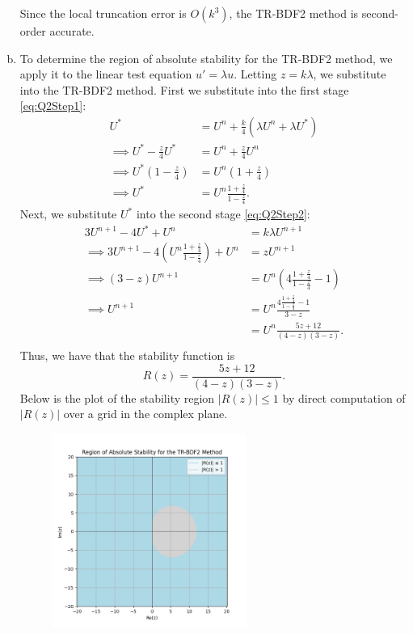\documentclass{article}
\begin{document}
\begin{enumerate}[(a)]
    Since the local truncation error is $O(k^3)$, the TR-BDF2 method is second-order accurate.





    \item To determine the region of absolute stability for the TR-BDF2 method, we apply it to the linear test equation $u' = \lambda u$. Letting $z = k\lambda$, we substitute into the TR-BDF2 method. First we substitute into the first stage \eqref{eq:Q2Step1}:
    \begin{align*}
        U^{*} &= U^n + \frac{k}{4}(\lambda U^n + \lambda U^{*}) \\
        \implies U^{*} - \frac{z}{4}U^{*} &= U^n + \frac{z}{4}U^n \\
        \implies U^{*}\left(1 - \frac{z}{4}\right) &= U^n\left(1 + \frac{z}{4}\right) \\
        \implies U^{*} &= U^n \frac{1 + \frac{z}{4}}{1 - \frac{z}{4}}.
    \end{align*}
    Next, we substitute $U^{*}$ into the second stage \eqref{eq:Q2Step2}:
    \begin{align*}
        3U^{n+1} - 4U^{*} + U^n &= k\lambda U^{n+1} \\
        \implies 3U^{n+1} - 4\left(U^n \frac{1 + \frac{z}{4}}{1 - \frac{z}{4}}\right) + U^n &= z U^{n+1} \\
        \implies (3 - z)U^{n+1} &= U^n\left(4\frac{1 + \frac{z}{4}}{1 - \frac{z}{4}} - 1\right) \\
        \implies U^{n+1} &= U^n \frac{4\frac{1 + \frac{z}{4}}{1 - \frac{z}{4}} - 1}{3 - z} \\
                        &= U^n \frac{5z + 12}{(4-z)(3 - z)}. \\
    \end{align*}
    Thus, we have that the stability function is
    \begin{equation}
        R(z) = \frac{5z + 12}{(4-z)(3 - z)}. \label{eq:Q2StabilFunc}
    \end{equation}
    Below is the plot of the stability region $|R(z)| \leq 1$ by direct computation of $|R(z)|$ over a grid in the complex plane.
    \begin{figure}[H]
        \centering
        \includegraphics[width=0.6\textwidth]{Q2b.png}

\end{figure}
\end{enumerate}
\end{document}
